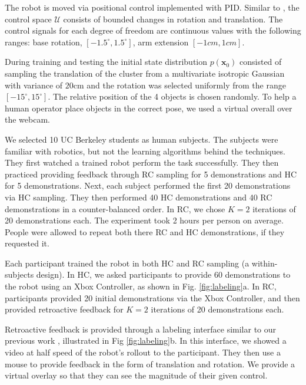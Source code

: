 \documentclass[10pt, conference]{ieeeconf}      %
\newcommand{\bx}{\mathbf{x}}
\begin{document}
The robot is moved via positional control implemented with PID. Similar to \cite{laskeyshiv}, the control space $\mathcal{U}$ consists of bounded changes in rotation and translation. The control signals for each degree of freedom are continuous values with the following ranges: base rotation, $[-1.5^\circ,1.5^\circ]$, arm extension $[-1cm,1cm]$.

During training and testing the initial state distribution $p(\bx_0)$ consisted of sampling the translation of the cluster from a multivariate isotropic Gaussian with variance of $20$cm and the rotation was selected uniformly from the range $[-15^\circ,15^\circ]$. The relative position of the 4 objects is chosen randomly. To help a human operator place objects in the correct pose, we used a virtual overall over the webcam.   

We selected 10 UC Berkeley students as human subjects. The subjects were familiar with robotics, but not the learning algorithms behind the techniques. They first watched a trained robot perform the task successfully.  They then practiced providing feedback through RC sampling for 5 demonstrations and HC for 5 demonstrations. Next, each subject performed the first 20 demonstrations via HC sampling. They then performed 40 HC demonstrations and 40 RC demonstrations in a counter-balanced order. In RC, we chose $K=2$ iterations of 20 demonstrations each. The experiment took 2 hours per person on average. People were allowed to repeat both there RC and HC demonstrations, if they requested it. 

Each participant trained the robot in both HC and RC sampling (a within-subjects design). In HC, we asked participants to provide 60 demonstrations to the robot using an Xbox Controller, as shown in Fig. \ref{fig:labeling}a. In RC, participants provided 20 initial demonstrations via the Xbox Controller, and then provided retroactive feedback for $K=2$ iterations of 20 demonstrations each.

Retroactive feedback is provided through a labeling interface similar to our previous work \cite{laskeyrobot}, illustrated in Fig \ref{fig:labeling}b. In this interface, we showed a video at half speed of the robot's rollout to the participant. They then use a mouse to provide feedback in the form of translation and rotation. We provide a virtual overlay so that they can see the magnitude of their given control. 
\end{document}
